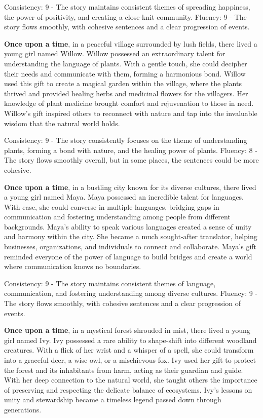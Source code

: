 \documentclass{article}
\begin{document}
Consistency: 9 - The story maintains consistent themes of spreading happiness, the power of positivity, and creating a close-knit community.
Fluency: 9 - The story flows smoothly, with cohesive sentences and a clear progression of events.

\textbf{Once upon a time}, in a peaceful village surrounded by lush fields, there lived a young girl named Willow. Willow possessed an extraordinary talent for understanding the language of plants. With a gentle touch, she could decipher their needs and communicate with them, forming a harmonious bond. Willow used this gift to create a magical garden within the village, where the plants thrived and provided healing herbs and medicinal flowers for the villagers. Her knowledge of plant medicine brought comfort and rejuvenation to those in need. Willow's gift inspired others to reconnect with nature and tap into the invaluable wisdom that the natural world holds.

Consistency: 9 - The story consistently focuses on the theme of understanding plants, forming a bond with nature, and the healing power of plants.
Fluency: 8 - The story flows smoothly overall, but in some places, the sentences could be more cohesive.

\textbf{Once upon a time}, in a bustling city known for its diverse cultures, there lived a young girl named Maya. Maya possessed an incredible talent for languages. With ease, she could converse in multiple languages, bridging gaps in communication and fostering understanding among people from different backgrounds. Maya's ability to speak various languages created a sense of unity and harmony within the city. She became a much sought-after translator, helping businesses, organizations, and individuals to connect and collaborate. Maya's gift reminded everyone of the power of language to build bridges and create a world where communication knows no boundaries.

Consistency: 9 - The story maintains consistent themes of language, communication, and fostering understanding among diverse cultures.
Fluency: 9 - The story flows smoothly, with cohesive sentences and a clear progression of events.

\textbf{Once upon a time}, in a mystical forest shrouded in mist, there lived a young girl named Ivy. Ivy possessed a rare ability to shape-shift into different woodland creatures. With a flick of her wrist and a whisper of a spell, she could transform into a graceful deer, a wise owl, or a mischievous fox. Ivy used her gift to protect the forest and its inhabitants from harm, acting as their guardian and guide. With her deep connection to the natural world, she taught others the importance of preserving and respecting the delicate balance of ecosystems. Ivy's lessons on unity and stewardship became a timeless legend passed down through generations.
\end{document}
